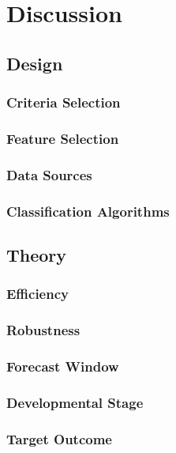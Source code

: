 \documentclass[../thesis/thesis.tex]{subfiles}
\begin{document}
\chapter{Discussion}
\label{chap:discussion}


\section{Design}

\subsection{Criteria Selection}
\subsection{Feature Selection}
\subsection{Data Sources}
\subsection{Classification Algorithms}

\section{Theory}

\subsection{Efficiency}
\subsection{Robustness}
\subsection{Forecast Window}
\subsection{Developmental Stage}
\subsection{Target Outcome}
\end{document}
